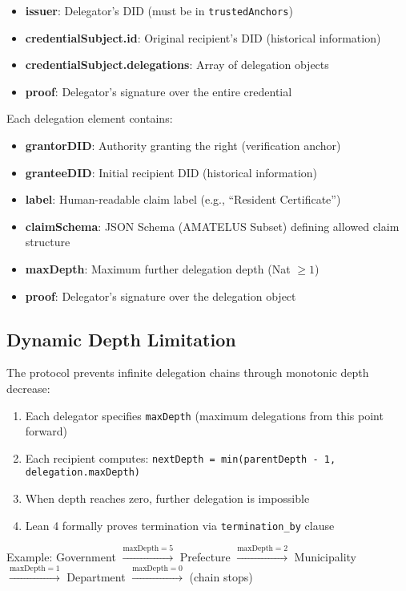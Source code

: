 \begin{itemize}
  \item \textbf{issuer}: Delegator's DID (must be in \texttt{trustedAnchors})
  \item \textbf{credentialSubject.id}: Original recipient's DID (historical information)
  \item \textbf{credentialSubject.delegations}: Array of delegation objects
  \item \textbf{proof}: Delegator's signature over the entire credential
\end{itemize}

Each delegation element contains:

\begin{itemize}
  \item \textbf{grantorDID}: Authority granting the right (verification anchor)
  \item \textbf{granteeDID}: Initial recipient DID (historical information)
  \item \textbf{label}: Human-readable claim label (e.g., ``Resident Certificate'')
  \item \textbf{claimSchema}: JSON Schema (AMATELUS Subset) defining allowed claim structure
  \item \textbf{maxDepth}: Maximum further delegation depth (Nat $\geq 1$)
  \item \textbf{proof}: Delegator's signature over the delegation object
\end{itemize}

\subsection{Dynamic Depth Limitation}

The protocol prevents infinite delegation chains through monotonic depth decrease:

\begin{enumerate}
  \item Each delegator specifies \texttt{maxDepth} (maximum delegations from this point forward)
  \item Each recipient computes: \texttt{nextDepth = min(parentDepth - 1, delegation.maxDepth)}
  \item When depth reaches zero, further delegation is impossible
  \item Lean 4 formally proves termination via \texttt{termination\_by} clause
\end{enumerate}

Example: Government $\xrightarrow{\text{maxDepth}=5}$ Prefecture $\xrightarrow{\text{maxDepth}=2}$ Municipality $\xrightarrow{\text{maxDepth}=1}$ Department $\xrightarrow{\text{maxDepth}=0}$ (chain stops)


